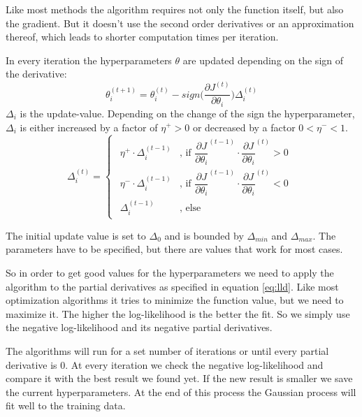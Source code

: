 Like most methods the algorithm requires not only the function itself, but also the gradient. But it doesn't use the second order derivatives or an approximation thereof, which leads to shorter computation times per iteration. 

In every iteration the hyperparameters $\theta$ are updated depending on the sign of the derivative:
\begin{equation}
\theta_i^{(t+1)} = \theta_i^{(t)} - sign\bigg(\dfrac{\partial J^{(t)}}{\partial \theta_i}\bigg) \Delta_i^{(t)}
\end{equation}
$\Delta_i$ is the update-value. Depending on the change of the sign the hyperparameter, $\Delta_i$ is either increased by a factor of $\eta^+ > 0$ or decreased by a factor $0 < \eta^- < 1$. 
\begin{equation}
\Delta_i^{(t)} = 
\begin{cases}
\begin{aligned}
\eta^+\cdot\Delta_i^{(t-1)} &\text{, if } \dfrac{\partial J}{\partial \theta_i}^{(t-1)}\cdot\dfrac{\partial J}{\partial \theta_i}^{(t)} > 0 \\
\eta^-\cdot\Delta_i^{(t-1)} &\text{, if } \dfrac{\partial J}{\partial \theta_i}^{(t-1)}\cdot\dfrac{\partial J}{\partial \theta_i}^{(t)} < 0\\
\Delta_i^{(t-1)} &\text{, else}
\end{aligned}
\end{cases}
\end{equation}

The initial update value is set to $\Delta_0$ and is bounded by $\Delta_{min}$ and $\Delta_{max}$. The parameters have to be specified, but there are values that work for most cases. 

So in order to get good values for the hyperparameters we need to apply the algorithm to the partial derivatives as specified in equation \ref{eq:lld}. Like most optimization algorithms it tries to minimize the function value, but we need to maximize it. The higher the log-likelihood is the better the fit. So we simply use the negative log-likelihood and its negative partial derivatives. 

The algorithms will run for a set number of iterations or until every partial derivative is 0. At every iteration we check the negative log-likelihood and compare it with the best result we found yet. If the new result is smaller we save the current hyperparameters. At the end of this process the Gaussian process will fit well to the training data.